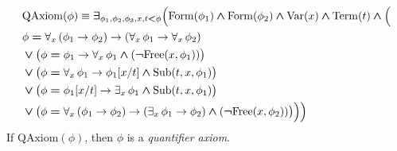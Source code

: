 \documentclass[10pt]{amsart}
\newcommand{\mexists}{\boldsymbol{\exists}}
\newcommand{\mand}{\boldsymbol{\wedge}}
\newcommand{\mor}{\boldsymbol{\vee}}
\newcommand{\mneg}{\boldsymbol{\neg}}
\newcommand{\mle}{\boldsymbol{<}}
\newcommand{\meq}{\boldsymbol{=}}
\begin{document}
\begin{definition}
	$$
		\begin{aligned}[t]
			 & \mathrm{QAxiom}(\phi) \equiv \mexists_{\phi_{\rm{1}},\phi_{\rm{2}},\phi_{\rm{3}},x,t \mle \phi}\Bigl(\mathrm{Form}(\phi_{\rm{1}})\mand \mathrm{Form}(\phi_{\rm{2}}) \mand \mathrm{Var}(x) \mand \mathrm{Term}(t) \mand \Bigl( \\
			 & \begin{aligned}[t]
				    & \phi \meq \forall_x \left(\phi_{\rm{1}} \ra \phi_{\rm{2}}\right) \ra \left(\forall_x\,\phi_{\rm{1}} \ra \forall_x\,\phi_{\rm{2}}\right)                                                                          \\
				    & \mor \bigl(\phi \meq \phi_{\rm{1}} \ra \forall_x\,\phi_{\rm{1}} \mand \left(\mneg \mathrm{Free}(x,\phi_{\rm{1}})\right)\bigr)                                                                                                       \\
				    & \mor \bigl(\phi \meq \forall_x\,\phi_{\rm{1}} \ra \phi_{\rm{1}}[x/t] \mand \mathrm{Sub}(t,x,\phi_{\rm{1}})\bigr)                                                                                                 \\
				    & \mor \bigl(\phi \meq \phi_{\rm{1}}[x/t] \ra \exists_x\,\phi_{\rm{1}} \mand \mathrm{Sub}(t,x,\phi_{\rm{1}})\bigr)                                                                                                 \\
				    & \mor \bigl(\phi \meq \forall_x\left(\phi_{\rm{1}} \ra \phi_{\rm{2}}\right) \ra \left(\exists_x\,\phi_{\rm{1}} \ra \phi_{\rm{2}}\right) \mand \left(\mneg \mathrm{Free}(x,\phi_{\rm{2}})\right)\bigr)\Bigr)\Bigr) \\
			   \end{aligned}
		\end{aligned}
	$$
	If $\mathrm{QAxiom}(\phi)$, then $\phi$ is a \textit{quantifier axiom}.
\end{definition}
\end{document}
